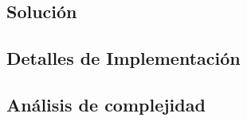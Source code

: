\subsection*{Solución}

\subsection*{Detalles de Implementación}

\subsection*{Análisis de complejidad}